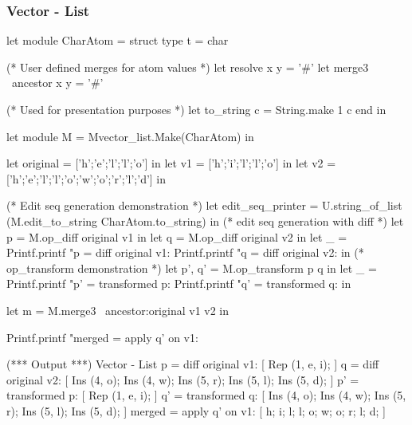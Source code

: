 \documentclass{article}
\begin{document}
\subsubsection{Vector - List}
\begin{longlisting}
let module CharAtom = struct
  type t = char

  (* User defined merges for atom values *)
  let resolve x y = '#'
  let merge3 ~ancestor x y = '#'

  (* Used for presentation purposes *)
  let to_string c = String.make 1 c
end in

let module M = Mvector_list.Make(CharAtom) in

let original = ['h';'e';'l';'l';'o'] in
let v1 = ['h';'i';'l';'l';'o'] in
let v2 = ['h';'e';'l';'l';'o';'w';'o';'r';'l';'d'] in

(* Edit seq generation demonstration *)
let edit_seq_printer = U.string_of_list (M.edit_to_string CharAtom.to_string) in 
(* edit seq generation with diff *)
let p = M.op_diff original v1 in
let q = M.op_diff original v2 in
let _ = 
  Printf.printf "p = diff original v1: %
  Printf.printf "q = diff original v2: %
in
(* op_transform demonstration *)
let p', q' = M.op_transform p q in
let _ = 
  Printf.printf "p' = transformed p: %
  Printf.printf "q' = transformed q: %
in

let m = M.merge3 ~ancestor:original v1 v2 in

Printf.printf "merged = apply q' on v1: %

(*** Output ***)
Vector - List
p = diff original v1: [ Rep (1, e, i); ]
q = diff original v2: [ Ins (4, o); Ins (4, w); Ins (5, r); Ins (5, l); Ins (5, d); ]
p' = transformed p: [ Rep (1, e, i); ]
q' = transformed q: [ Ins (4, o); Ins (4, w); Ins (5, r); Ins (5, l); Ins (5, d); ]
merged = apply q' on v1: [ h; i; l; l; o; w; o; r; l; d; ]
\end{longlisting}
\end{document}
